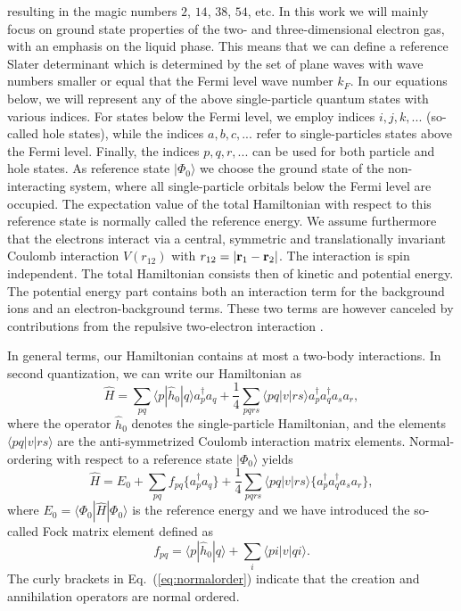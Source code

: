 \documentclass[aps,twocolumn,showpacs,floatfix,nofootinbib,preprintnumbers,superscriptaddress,amsmath,amssymb]{revtex4-1}
\begin{document}
resulting in the magic numbers $2$, $14$, $38$, $54$, etc. 
In this work we will mainly focus on ground state properties of the two- and three-dimensional electron gas, with an emphasis on the liquid phase.
This means that we can define a reference Slater determinant which is determined by the set of plane waves with wave numbers smaller or equal 
that the Fermi level wave number $k_F$.  In our equations below, we will represent any of the above single-particle quantum states
with various indices. For states below the Fermi level, we employ indices $i,j,k,...$ (so-called hole states), while the 
 indices $a,b,c,...$ refer to single-particles states above the Fermi level. Finally, the indices $ p,q,r,...$ can be used for both particle and hole states. As reference state $|\Phi_0\rangle$  we choose the ground state of the non-interacting system, 
where all single-particle orbitals below the Fermi level are occupied.  The expectation value of the total Hamiltonian with respect to 
this reference state is normally called the reference energy. 
We assume furthermore that the electrons interact via a central, symmetric and translationally invariant
Coulomb interaction  $V(r_{12})$ with
$r_{12}=|{\bf r}_1-{\bf r}_2|$.  The interaction is spin independent.
The total Hamiltonian consists then of kinetic and potential energy.
The potential energy part contains both an interaction term for the background ions and an electron-background terms. These two terms are however canceled
by contributions from the repulsive two-electron interaction \cite{fetter}. 

In general terms, our Hamiltonian contains at most a  two-body interactions. In second quantization, we can write our Hamiltonian as
\begin{equation}
\hat{H}= \sum_{pq}\langle p | \hat{h}_0 | q \rangle a_p^{\dagger} a_q + \frac{1}{4}\sum_{pqrs}\langle pq |v| r s \rangle a_p^{\dagger} a_q^{\dagger} a_s a_r,
\label{eq:ourHamiltonian}
\end{equation} 
where the operator $\hat{h}_0$ denotes the single-particle Hamiltonian, and the elements $\langle pq|v|rs\rangle$ 
are the anti-symmetrized Coulomb interaction matrix elements.
Normal-ordering with respect to a reference state $|\Phi_0\rangle$ yields 
\begin{equation}
\hat{H}=E_0 + \sum_{pq}f_{pq}\lbrace a_p^{\dagger} a_q\rbrace + \frac{1}{4}\sum_{pqrs}\langle pq |v| r s \rangle \lbrace a_p^{\dagger} a_q^{\dagger} a_s a_r \rbrace,
\label{eq:normalorder}
\end{equation}
where $E_0=\langle\Phi_0| \hat{H}| \Phi_0\rangle$ is the reference energy
and we have introduced the so-called  Fock matrix element defined as
\begin{equation}
f_{pq} = \langle p|\hat{h}_0| q \rangle + \sum\limits_{i} \langle pi |v| qi\rangle.
\label{eq:fockelement}
\end{equation}
The curly brackets in Eq.~(\ref{eq:normalorder}) indicate that the creation and annihilation operators are normal ordered.
\end{document}
